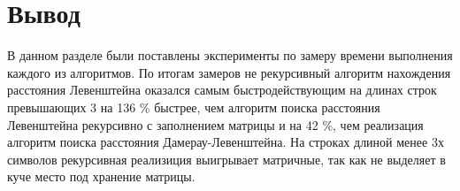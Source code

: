 
    \section{Вывод}
        В данном разделе были поставлены эксперименты по замеру времени
        выполнения каждого из алгоритмов. По итогам замеров не рекурсивный 
        алгоритм нахождения расстояния Левенштейна оказался самым быстродействующим
        на длинах строк превышающих 3 на 136 \% быстрее, чем алгоритм поиска
        расстояния Левенштейна рекурсивно с заполнением матрицы и на 42 \%,
        чем реализация алгоритм поиска расстояния Дамерау-Левенштейна. На строках
        длиной менее 3х символов рекурсивная реализиция выигрывает матричные, так
        как не выделяет в куче место под хранение матрицы.  
        
\newpage